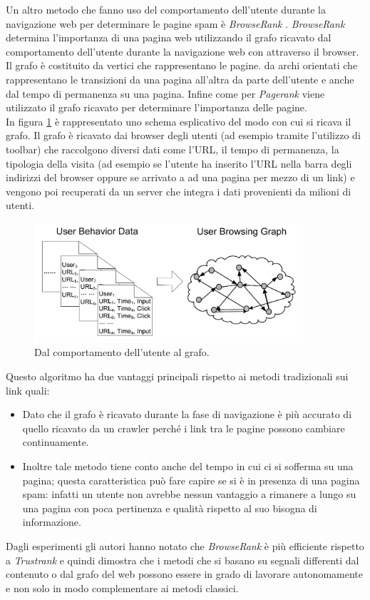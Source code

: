 Un altro metodo che fanno uso del comportamento dell'utente durante la navigazione web per determinare le pagine spam è \textit{BrowseRank} \cite{Liu:2008:BLW:1390334.1390412}. \textit{BrowseRank} determina l'importanza di una pagina web utilizzando il grafo ricavato dal comportamento dell'utente durante la navigazione web con attraverso il browser. Il grafo è costituito da vertici che rappresentano le pagine. da archi orientati che rappresentano le transizioni da una pagina all'altra da parte dell'utente e anche dal tempo di permanenza su una pagina. Infine come per \textit{Pagerank} viene utilizzato il grafo ricavato per determinare l'importanza delle pagine.\\
In figura \ref{img:browser} è rappresentato uno schema esplicativo del modo con cui si ricava il grafo. Il grafo è ricavato dai browser degli utenti (ad esempio tramite l'utilizzo di toolbar) che raccolgono diversi dati come l'URL, il tempo di permanenza, la tipologia della visita (ad esempio se l'utente ha inserito l'URL nella barra degli indirizzi 
del browser oppure se arrivato a ad una pagina per mezzo di un link) e vengono poi recuperati da un server che integra i dati provenienti da milioni di utenti.
\begin{figure}
\centering
\includegraphics[width=10cm]{immagini/altre/browser.png}
\caption{Dal comportamento dell'utente al grafo.}
\label{img:browser}
\end{figure}
Questo algoritmo ha due vantaggi principali rispetto ai metodi tradizionali sui link quali:
\begin{itemize}
 \item Dato che il grafo è ricavato durante la fase di navigazione è più accurato di quello ricavato da un crawler perché i link tra le pagine possono cambiare continuamente.
 \item Inoltre tale metodo tiene conto anche del tempo in cui ci si sofferma su una pagina; questa caratteristica può fare capire se si è in presenza di una pagina spam: infatti un utente non avrebbe nessun vantaggio a rimanere a lungo su una pagina con poca pertinenza e qualità rispetto al suo bisogna di informazione.
\end{itemize}
\newpage
Dagli esperimenti gli autori hanno notato che \textit{BrowseRank} è più efficiente rispetto a \textit{Trustrank} e quindi dimostra che i metodi che si basano su segnali differenti dal contenuto o dal grafo del web possono essere in grado di lavorare autonomamente e non solo in modo  complementare ai metodi classici.


